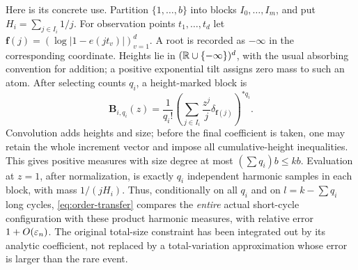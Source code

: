 \documentclass[11pt]{article}
\theoremstyle{definition}\newtheorem{definition}[theorem]{Definition}
\theoremstyle{remark}\newtheorem{remark}[theorem]{Remark}
\numberwithin{equation}{section}\allowdisplaybreaks
\begin{document}
Here is its concrete use. Partition $\{1,\ldots,b\}$ into blocks
$I_0,\ldots,I_m$, and put $H_i=\sum_{j\in I_i}1/j$. For observation
points $t_1,\ldots,t_d$ let
$\boldsymbol f(j)=(\log|1-e(jt_v)|)_{v=1}^d$. A root is recorded as
$-\infty$ in the corresponding coordinate. Heights lie in
$(\mathbb R\cup\{-\infty\})^d$, with the usual absorbing convention for
addition; a positive exponential tilt assigns zero mass to such an atom.
After selecting counts $q_i$, a height-marked block is
\begin{equation}\label{eq:measure-block}
 \boldsymbol B_{i,q_i}(z)
 =\frac1{q_i!}\left(\sum_{j\in I_i}\frac{z^j}{j}
                       \delta_{\boldsymbol f(j)}\right)^{*q_i}.
\end{equation}
Convolution adds heights and size; before the final coefficient is taken,
one may retain the whole increment vector and impose all cumulative-height
inequalities. This gives positive measures with size degree at most
$(\sum q_i)b\le kb$. Evaluation at $z=1$, after normalization, is exactly
$q_i$ independent harmonic samples in each block, with mass $1/(jH_i)$.
Thus, conditionally on all $q_i$ and on $l=k-\sum q_i$ long cycles,
\eqref{eq:order-transfer} compares the \emph{entire} actual short-cycle
configuration with these product harmonic measures, with relative error
$1+O(\varepsilon_n)$. The original total-size constraint has been integrated
out by its analytic coefficient, not replaced by a total-variation
approximation whose error is larger than the rare event.
\end{document}
